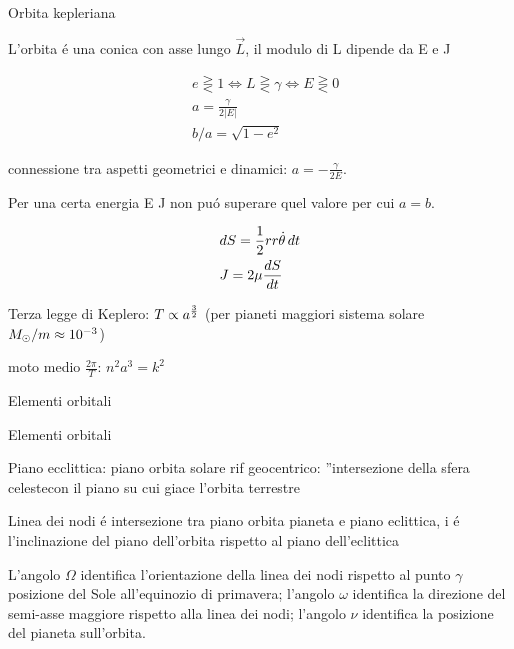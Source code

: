 \begin{wordonframe}{Orbita kepleriana}

L'orbita \'e una conica con asse lungo $\vec{L}$, il modulo di L dipende da E e J

\begin{align*}
&e\gtreqless1\Leftrightarrow L\gtreqless\gamma\Leftrightarrow E\gtreqless0\\
&a=\frac{\gamma}{2|E|}\\
&b/a=\sqrt{1-e^2}
\end{align*}

connessione tra aspetti geometrici e dinamici: $a=-\frac{\gamma}{2E}$.

Per una certa energia E J non pu\'o superare quel valore per cui $a=b$.

\begin{align*}
&dS=\frac{1}{2}rr\dot{\theta}\,dt\\
&J=2\mu\TDy{t}{S}
\end{align*}

Terza legge di Keplero: $T\propto a\expy{\frac{3}{2}}$ (per pianeti maggiori sistema solare $\msun{}/m\approx\num{e-3}$)

moto medio $\frac{2\pi}{T}$: $n^2a^3=k^2$

\end{wordonframe}


\begin{frame}{Elementi orbitali}



\end{frame}



\begin{wordonframe}{Elementi orbitali}

Piano ecclittica: piano orbita solare rif geocentrico: ''intersezione della sfera celestecon il piano su cui giace l'orbita terrestre

Linea dei nodi \'e intersezione tra piano orbita pianeta e piano eclittica, i \'e l'inclinazione del piano dell'orbita rispetto al piano dell'eclittica

L'angolo $\Omega$ identifica l'orientazione della linea dei nodi rispetto al punto $\gamma$ posizione del Sole all'equinozio di primavera; l'angolo $\omega$ identifica la direzione del semi-asse maggiore rispetto alla linea dei nodi; l'angolo $\nu$ identifica la posizione del pianeta sull'orbita.

\end{wordonframe}


